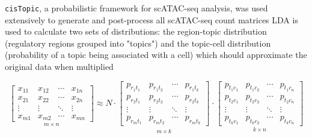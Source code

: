 
\verb|cisTopic|, a probabilistic framework for scATAC-seq analysis, was used extensively to generate and post-process all scATAC-seq count matrices LDA is used to calculate two sets of distributions: the region-topic distribution (regulatory regions grouped into "topics") and the topic-cell distribution (probability of a topic being associated with a cell) which should approximate the original data when multiplied

\[
	\underset{m \times n}{
		\begin{bmatrix}
			x_{11} & x_{12} & \cdots & x_{1n} \\
			x_{21} & x_{22} & \cdots & x_{2n} \\
			\vdots & \vdots & \ddots & \vdots \\
			x_{m1} & x_{m2} & \cdots & x_{mn}
		\end{bmatrix}}
	\approx
	N \cdot
	\underset{m \times k}{
	\begin{bmatrix}
		p_{r_1t_1} & p_{r_1t_2} & \cdots & p_{r_1t_k} \\
		p_{r_2t_1} & p_{r_2t_2} & \cdots & p_{r_2t_k} \\
		\vdots     & \vdots     & \ddots & \vdots     \\
		p_{r_mt_1} & p_{r_mt_2} & \cdots & p_{r_mt_k}
	\end{bmatrix}_{}}
	\cdot
	\underset{k \times n}{
		\begin{bmatrix}
			p_{t_1c_1} & p_{t_1c_2} & \cdots & p_{t_1c_n} \\
			p_{t_2c_1} & p_{t_2c_2} & \cdots & p_{t_2c_n} \\
			\vdots     & \vdots     & \ddots & \vdots     \\
			p_{t_kc_1} & p_{t_kc_2} & \cdots & p_{t_kc_n}
		\end{bmatrix}}
\]

